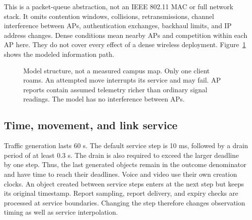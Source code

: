 \documentclass[11pt,a4paper]{article}
\begin{document}
This is a packet-queue abstraction, not an IEEE 802.11 MAC or full network stack. It omits contention windows, collisions, retransmissions, channel interference between APs, authentication exchanges, backhaul limits, and IP address changes. Dense conditions mean nearby APs and competition within each AP here. They do not cover every effect of a dense wireless deployment. Figure~\ref{fig:model} shows the modeled information path.

\begin{figure}[htbp]
\centering
{}
\caption{Model structure, not a measured campus map. Only one client roams. An attempted move interrupts its service and may fail. AP reports contain assumed telemetry richer than ordinary signal readings. The model has no interference between APs.}\label{fig:model}
\end{figure}

\subsection{Time, movement, and link service}
Traffic generation lasts 60 s. The default service step is 10 ms, followed by a drain period of at least 0.3 s. The drain is also required to exceed the larger deadline by one step. Thus, the last generated objects remain in the outcome denominator and have time to reach their deadlines. Voice and video use their own creation clocks. An object created between service steps enters at the next step but keeps its original timestamp. Report sampling, report delivery, and expiry checks are processed at service boundaries. Changing the step therefore changes observation timing as well as service interpolation.
\end{document}
